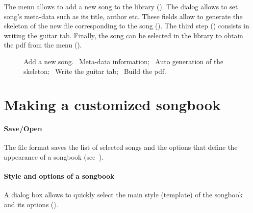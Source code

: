 The menu  allows to add a new song to the
library (). The dialog allows to set song's
meta-data such as its title, author etc. These fields allow to
generate the skeleton of the new file  corresponding to the
song (). The third step
() consists in writing the guitar tab. Finally,
the song can be selected in the library to obtain the pdf from the
menu  ().

\begin{figure}
  \centering
  \hspace{0.1cm}%
  \hspace{0.1cm}%
  \hspace{0.1cm}%
  \caption{%
    Add a new song.
    ~Meta-data information; %
    ~Auto generation of the  skeleton; %
    ~Write the guitar tab; %
    ~Build the pdf.%
  }%
  \label{fig:new-song}
\end{figure}


\section{Making a customized songbook}

\paragraph{Save/Open}
The  file format saves the list of selected songs
and the options that define the appearance of a songbook
(see~).

\paragraph{Style and options of a songbook}
A dialog box allows to quickly select the main style (template) of the
songbook and its options ().

